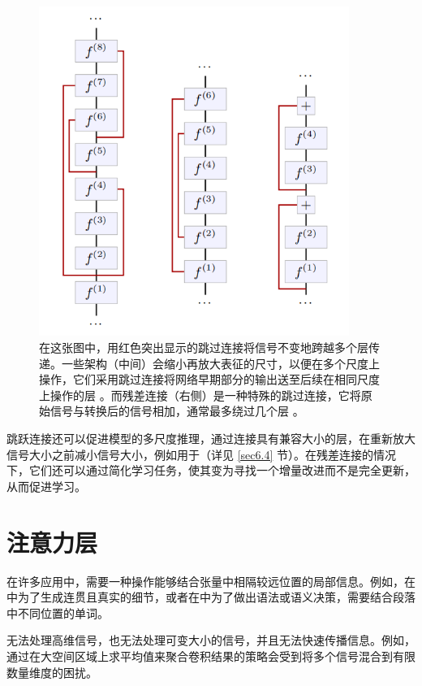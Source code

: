 \begin{figure}
    \centering
    \includegraphics[width=0.9\textwidth]{fig/fig4.10.png}
    \caption[跳跃连接]{在这张图中，用红色突出显示的跳过连接将信号不变地跨越多个层传递。一些架构（中间）会缩小再放大表征的尺寸，以便在多个尺度上操作，它们采用跳过连接将网络早期部分的输出送至后续在相同尺度上操作的层 \citep{arxiv-1411.4038, arxiv-1505.04597}。而残差连接（右侧）是一种特殊的跳过连接，它将原始信号与转换后的信号相加，通常最多绕过几个层 \citep{arxiv-1512.03385}。}
    \label{fig4.10}
\end{figure}

跳跃连接还可以促进模型的多尺度推理，通过连接具有兼容大小的层，在重新放大信号大小之前减小信号大小，例如用于（详见 \ref{sec6.4} 节）。在残差连接的情况下，它们还可以通过简化学习任务，使其变为寻找一个增量改进而不是完全更新，从而促进学习。

\section{注意力层}\label{sec4.8}

在许多应用中，需要一种操作能够结合张量中相隔较远位置的局部信息。例如，在中为了生成连贯且真实的细节，或者在中为了做出语法或语义决策，需要结合段落中不同位置的单词。

无法处理高维信号，也无法处理可变大小的信号，并且无法快速传播信息。例如，通过在大空间区域上求平均值来聚合卷积结果的策略会受到将多个信号混合到有限数量维度的困扰。


